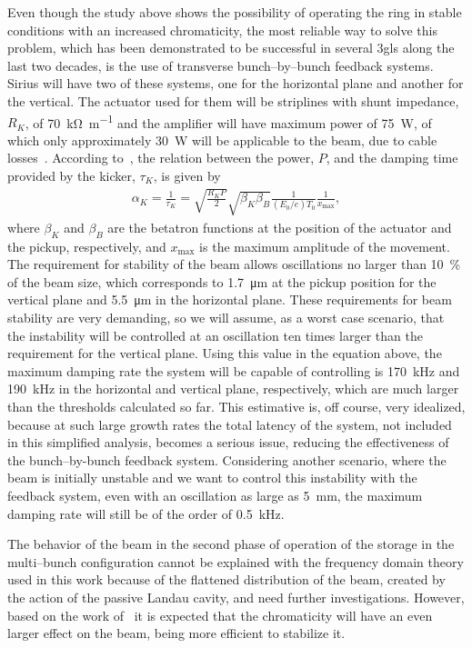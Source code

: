     Even though the study above shows the possibility of operating the ring in stable conditions with an increased chromaticity, the most reliable way to solve this problem, which has been demonstrated to be successful in several \gls{3gls} along the last two decades, is the use of transverse bunch--by--bunch feedback systems. Sirius will have two of these systems, one for the horizontal plane and another for the vertical. The actuator used for them will be striplines with shunt impedance, $R_K$, of \SI{70}{\kilo\ohm\per\meter} and the amplifier will have maximum power of \SI{75}{\watt}, of which only approximately \SI{30}{\watt} will be applicable to the beam, due to cable losses~\cite{Duarte2018}. According to~, the relation between the power, $P$, and the damping time provided by the kicker, $\tau_K$, is given by
    \begin{align}
        \alpha_K = \frac{1}{\tau_K} =
        \sqrt{\frac{R_KP}{2}}\sqrt{\beta_K\beta_B}\frac{1}{(E_0/e)T_0}\frac{1}{x_\text{max}},
    \end{align}
    where $\beta_K$ and $\beta_B$ are the betatron functions at the position of the actuator and the pickup, respectively, and $x_\text{max}$ is the maximum amplitude of the movement. The requirement for stability of the beam allows oscillations no larger than \SI{10}{\percent} of the beam size, which corresponds to \SI{1.7}{\micro\meter} at the pickup position for the vertical plane and \SI{5.5}{\micro\meter} in the horizontal plane. These requirements for beam stability are very demanding, so we will assume, as a worst case scenario, that the instability will be controlled at an oscillation ten times larger than the requirement for the vertical plane. Using this value in the equation above, the maximum damping rate the system will be capable of controlling is \SI{170}{\kilo\hertz} and \SI{190}{\kilo\hertz} in the horizontal and vertical plane, respectively, which are much larger than the thresholds calculated so far. This estimative is, off course, very idealized, because at such large growth rates the total latency of the system, not included in this simplified analysis, becomes a serious issue, reducing the effectiveness of the bunch--by-bunch feedback system.
    Considering another scenario, where the beam is initially unstable and we want to control this instability with the feedback system, even with an oscillation as large as \SI{5}{\milli\meter}, the maximum damping rate will still be of the order of \SI{0.5}{\kilo\hertz}.

    The behavior of the beam in the second phase of operation of the storage in the multi--bunch configuration cannot be explained with the frequency domain theory used in this work because of the flattened distribution of the beam, created by the action of the passive Landau cavity, and need further investigations. However, based on the work of~ it is expected that the chromaticity will have an even larger effect on the beam, being more efficient to stabilize it.

